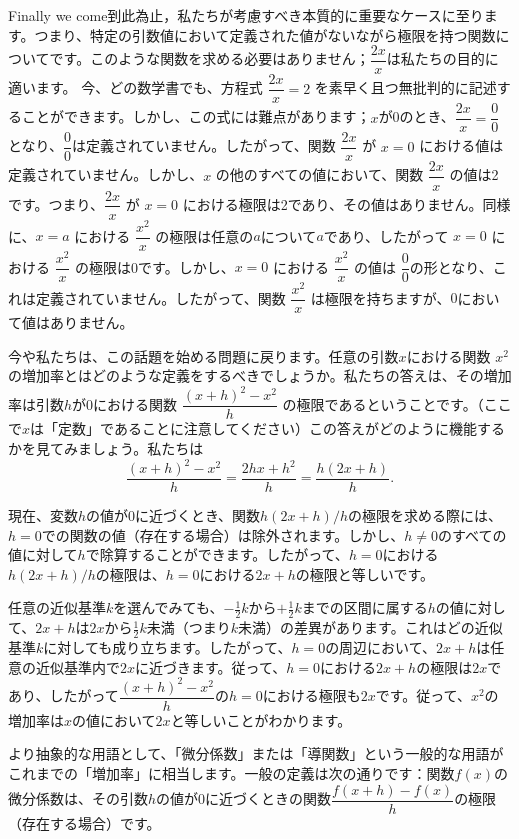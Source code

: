 \documentclass[a4paper,11pt,openany]{ltjsbook}
\providecommand{\Chg}[2]{#2}
\providecommand{\Add}[1]{\Chg{}{#1}}
\begin{document}
Finally we come到此為止，私たちが考慮すべき本質的に重要なケースに至ります。つまり、特定の引数値において定義された値がないながら極限を持つ関数についてです。このような関数を求める必要はありません；$\dfrac{2x}{x}$は私たちの目的に適います。
今、どの数学書でも、方程式 $\dfrac{2x}{x} = 2$ を素早く且つ無批判的に記述することができます。しかし、この式には難点があります；$x$が0のとき、$\dfrac{2x}{x} = \dfrac{0}{0}$となり、$\dfrac{0}{0}$は定義されていません。したがって、関数 $\dfrac{2x}{x}$ が $x = 0$ における値は定義されていません。しかし、$x$ の他のすべての値において、関数 $\dfrac{2x}{x}$ の値は2です。つまり、$\dfrac{2x}{x}$ が $x = 0$ における極限は2であり、その値はありません。同様に、$x = a$ における $\dfrac{x^{2}}{x}$ の極限は任意の$a$について$a$であり、したがって $x = 0$ における $\dfrac{x^{2}}{x}$ の極限は0です。しかし、$x = 0$ における $\dfrac{x^{2}}{x}$ の値は $\dfrac{0}{0}$の形となり、これは定義されていません。したがって、関数 $\dfrac{x^{2}}{x}$ は極限を持ちますが、$0$において値はありません。

今や私たちは、この話題を始める問題に戻ります。任意の引数$x$における関数 $x^{2}$ の増加率とはどのような定義をするべきでしょうか。私たちの答えは、その増加率は引数$h$が0における関数 $\dfrac{(x + h)^{2} - x^{2}}{h}$ の極限であるということです。（ここで$x$は「定数」であることに注意してください）この答えがどのように機能するかを見てみましょう。私たちは
\[
\dfrac{(x + h)^{2} - x^{2}}{h}
  = \dfrac{2hx + h^{2}}{h}
  = \dfrac{h(2x + h)}{h}\Add{.}
\]

現在、変数$h$の値が$0$に近づくとき、関数$h(2x + h)/h$の極限を求める際には、$h = 0$での関数の値（存在する場合）は除外されます。しかし、$h \neq 0$のすべての値に対して$h$で除算することができます。したがって、$h = 0$における$h(2x + h)/h$の極限は、$h = 0$における$2x + h$の極限と等しいです。

任意の近似基準$k$を選んでみても、$-\frac{1}{2}k$から$+\frac{1}{2}k$までの区間に属する$h$の値に対して、$2x + h$は$2x$から$\frac{1}{2}k$未満（つまり$k$未満）の差異があります。これはどの近似基準$k$に対しても成り立ちます。したがって、$h = 0$の周辺において、$2x + h$は任意の近似基準内で$2x$に近づきます。従って、$h = 0$における$2x + h$の極限は$2x$であり、したがって$\dfrac{(x + h)^{2} - x^{2}}{h}$の$h = 0$における極限も$2x$です。従って、$x^{2}$の増加率は$x$の値において$2x$と等しいことがわかります。

より抽象的な用語として、「微分係数」または「導関数」という一般的な用語がこれまでの「増加率」に相当します。一般の定義は次の通りです：関数$f(x)$の微分係数は、その引数$h$の値が$0$に近づくときの関数$\dfrac{f(x + h) - f(x)}{h}$の極限（存在する場合）です。
\end{document}
